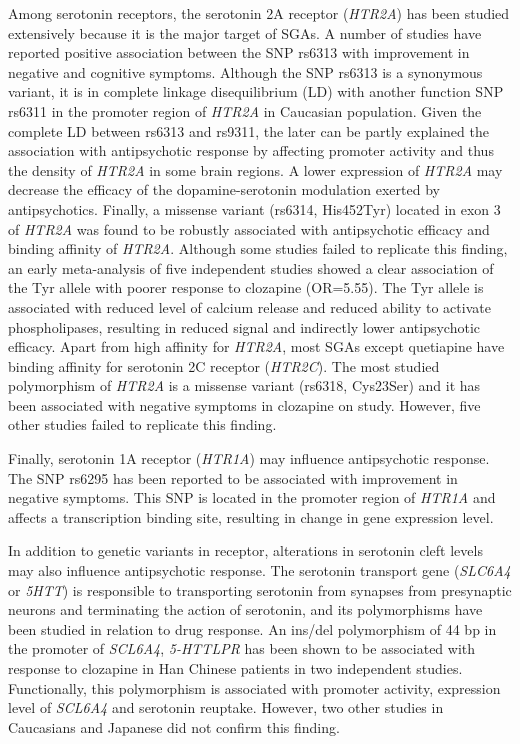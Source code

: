 \documentclass[12pt]{report}
\newcommand{\gene}[1]{\textit{#1}}
\begin{document}
				Among serotonin receptors, the serotonin 2A receptor (\gene{HTR2A}) has been studied extensively because it is the major target of SGAs. 
				A number of studies have reported positive association between the SNP rs6313 with improvement in negative and cognitive symptoms. 
				Although the SNP rs6313 is a synonymous variant, it is in complete linkage disequilibrium (LD) with another function SNP rs6311 in the promoter region of \gene{HTR2A} in Caucasian population.  
				Given the complete LD between rs6313 and rs9311, the later can be partly explained the association with antipsychotic response by affecting promoter activity and thus the density of \gene{HTR2A} in some brain regions. 
				A lower expression of \gene{HTR2A} may decrease the efficacy of the dopamine-serotonin modulation exerted by antipsychotics. 
				Finally, a missense variant (rs6314, His452Tyr) located in exon 3 of \gene{HTR2A} was found to be robustly associated with antipsychotic efficacy and binding affinity of \gene{HTR2A}.
				Although some studies failed to replicate this finding, an early meta-analysis of five independent studies showed a clear association of the Tyr allele with poorer response to clozapine (OR=5.55). 
				The Tyr allele is associated with reduced level of calcium release and reduced ability to activate phospholipases, resulting in reduced signal and indirectly lower antipsychotic efficacy.
				Apart from high affinity for \gene{HTR2A}, most SGAs except quetiapine have binding affinity for serotonin 2C receptor (\gene{HTR2C}). 
				The most studied polymorphism of \gene{HTR2A} is a missense variant (rs6318, Cys23Ser) and it has been associated with negative symptoms in clozapine on study. 
				However, five other studies failed to replicate this finding. 
				
				Finally, serotonin 1A receptor (\gene{HTR1A}) may influence antipsychotic response. 
				The SNP rs6295 has been reported to be associated with improvement in negative symptoms. 
				This SNP is located in the promoter region of \gene{HTR1A} and affects a transcription binding site, resulting in change in gene expression level. 		
				
				In addition to genetic variants in receptor, alterations in serotonin cleft levels may also influence antipsychotic response. 
				The serotonin transport gene (\gene{SLC6A4} or \gene{5HTT}) is responsible to transporting serotonin from synapses from presynaptic neurons and terminating the action of serotonin, and its polymorphisms have been studied in relation to drug response.  
				An ins/del polymorphism of 44 bp in the promoter of \gene{SCL6A4}, \gene{5-HTTLPR} has been shown to be associated with response to clozapine in Han Chinese patients in two independent studies.
				Functionally, this polymorphism is associated with promoter activity, expression level of \gene{SCL6A4} and serotonin reuptake. 
				However, two other studies in Caucasians and Japanese did not confirm this finding. 
\end{document}
